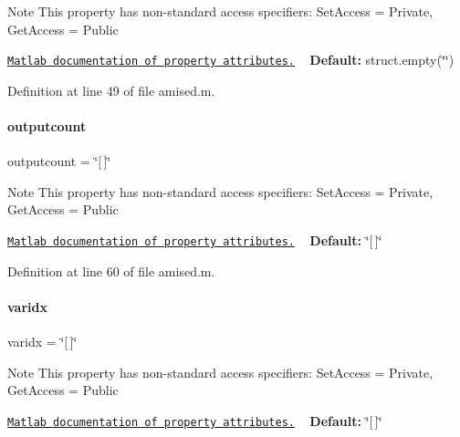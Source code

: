 \begin{DoxyNote}{Note}
This property has non-\/standard access specifiers\+: {\ttfamily Set\+Access = Private, Get\+Access = Public} 

\href{http://www.mathworks.com/help/matlab/matlab_oop/property-attributes.html}{\tt Matlab documentation of property attributes.} ~\newline
{\bfseries Default\+:} struct.\+empty(\char`\"{}\char`\"{}) 
\end{DoxyNote}


Definition at line 49 of file amised.\+m.

\mbox{\label{classamised_a2d1dd5be3732d16dc0d0feea17e03f04}} 
\paragraph{\texorpdfstring{outputcount}{outputcount}}
{\footnotesize\ttfamily outputcount = \char`\"{}\mbox{[}$\,$\mbox{]}\char`\"{}}

\begin{DoxyNote}{Note}
This property has non-\/standard access specifiers\+: {\ttfamily Set\+Access = Private, Get\+Access = Public} 

\href{http://www.mathworks.com/help/matlab/matlab_oop/property-attributes.html}{\tt Matlab documentation of property attributes.} ~\newline
{\bfseries Default\+:} \char`\"{}\mbox{[}$\,$\mbox{]}\char`\"{} 
\end{DoxyNote}


Definition at line 60 of file amised.\+m.

\mbox{\label{classamised_ad29088fdb92d731f3c64c6d2bd2ab43c}} 
\paragraph{\texorpdfstring{varidx}{varidx}}
{\footnotesize\ttfamily varidx = \char`\"{}\mbox{[}$\,$\mbox{]}\char`\"{}}

\begin{DoxyNote}{Note}
This property has non-\/standard access specifiers\+: {\ttfamily Set\+Access = Private, Get\+Access = Public} 

\href{http://www.mathworks.com/help/matlab/matlab_oop/property-attributes.html}{\tt Matlab documentation of property attributes.} ~\newline
{\bfseries Default\+:} \char`\"{}\mbox{[}$\,$\mbox{]}\char`\"{} 
\end{DoxyNote}


